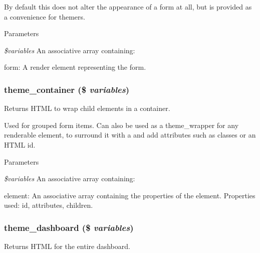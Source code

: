 By default this does not alter the appearance of a form at all, but is provided as a convenience for themers.


\begin{DoxyParams}{Parameters}
\item[{\em \$variables}]An associative array containing:
\begin{DoxyItemize}
\item form: A render element representing the form. 
\end{DoxyItemize}\end{DoxyParams}
\hypertarget{group__themeable_ga281b0f3a41586bc5ff324919699e902f}{
\subsubsection[{theme\_\-container}]{\setlength{\rightskip}{0pt plus 5cm}theme\_\-container (\$ {\em variables})}}
\label{group__themeable_ga281b0f3a41586bc5ff324919699e902f}
Returns HTML to wrap child elements in a container.

Used for grouped form items. Can also be used as a theme\_\-wrapper for any renderable element, to surround it with a  and add attributes such as classes or an HTML id.

 
\begin{DoxyParams}{Parameters}
\item[{\em \$variables}]An associative array containing:
\begin{DoxyItemize}
\item element: An associative array containing the properties of the element. Properties used: id, attributes, children. 
\end{DoxyItemize}\end{DoxyParams}
\hypertarget{group__themeable_ga6c02d8ffcbb05e9a3b8a6159588ea756}{
\subsubsection[{theme\_\-dashboard}]{\setlength{\rightskip}{0pt plus 5cm}theme\_\-dashboard (\$ {\em variables})}}
\label{group__themeable_ga6c02d8ffcbb05e9a3b8a6159588ea756}
Returns HTML for the entire dashboard.


